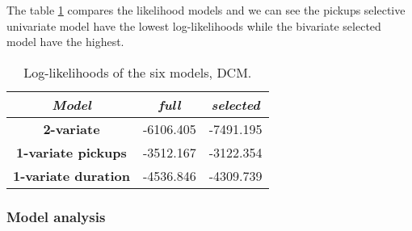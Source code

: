 The  table \ref{Log-likelihoods DCM} compares the likelihood models and we can see the pickups selective univariate model have the lowest log-likelihoods while the bivariate selected model have the highest.
\begin{table}
	\centering
	\renewcommand\arraystretch{1.3}
	\begin{tabular}{c|c|c}
		\hline
		\textit{Model} &\textit{full } & \textit{selected} \\ 
		\hline
		\textbf{2-variate } & -6106.405  & -7491.195    \\ 
		\hline
		\textbf{1-variate pickups } & -3512.167  & -3122.354    \\ 
		\hline
		\textbf{1-variate duration} & -4536.846  & -4309.739   \\ 
		\hline
	\end{tabular}
	\caption[Log-likelihoods of the six models (DCM)]{Log-likelihoods of the six models, DCM.}
	\label{Log-likelihoods DCM}
\end{table}



\subsubsection{Model analysis}

